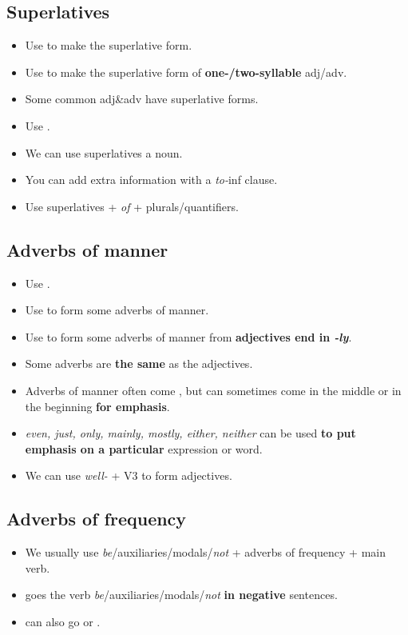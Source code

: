 \subsection{Superlatives}
\begin{itemize}
    \item Use  to make the superlative form.
    \item Use  to make the superlative form of \textbf{one-/two-syllable} adj/adv.
    \item Some common adj\&adv have  superlative forms.
    \item Use .
    \item We can use superlatives  a noun.
    \item[\doot] You can add extra information with a \textit{to-}inf clause.
    \item[\aast] Use superlatives + \textit{of} + plurals/quantifiers.
\end{itemize}

\subsection{Adverbs of manner}
\begin{itemize}
    \item Use .
    \item Use  to form some adverbs of manner.
    \item Use  to form some adverbs of manner from \textbf{adjectives end in \textit{-ly}}.
    \item Some adverbs are \textbf{the same} as the adjectives.
    \item[\doot] Adverbs of manner often come ,
    but can sometimes come in the middle or in the beginning \textbf{for emphasis}.
    \item[\doot] \textit{even, just, only, mainly, mostly, either, neither}
    can be used \textbf{to put emphasis on a particular} expression or word.
    \item[\aast] We can use \textit{well-} + V3 to form adjectives.
\end{itemize}

\subsection{Adverbs of frequency}
\begin{itemize}
    \item We usually use \textit{be}/auxiliaries/modals/\textit{not} + adverbs of frequency + main verb.
    \item[\doot]  goes
     the verb \textit{be}/auxiliaries/modals/\textit{not} \textbf{in negative} sentences.
    \item[\doot] 
    can also go  or .
\end{itemize}

